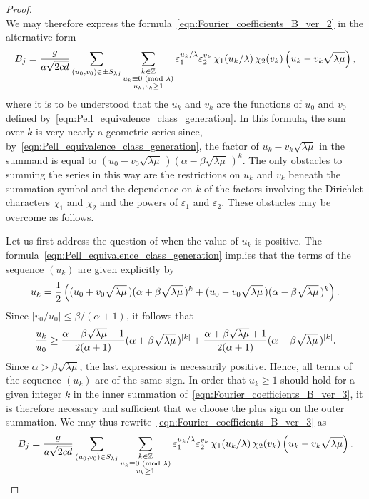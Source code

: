 \documentclass[11pt,reqno]{amsart}
\renewcommand{\=}{\;=\;}
\theoremstyle{myremark}
\begin{document}
\begin{proof}
\begin{equation}
\end{equation}
We may therefore express the formula~\eqref{eqn:Fourier_coefficients_B_ver_2} in the alternative form
\begin{equation} \label{eqn:Fourier_coefficients_B_ver_3}
B_j = {g \over a\sqrt{2cd}} \sum_{(u_0,v_0) \in \pm S_{\lambda j}} \sum_{\substack{k \in \mathbb{Z} \\ u_k \equiv 0 \text{ (mod $\lambda$)} \\ u_k, v_k \geq 1}} \varepsilon_1^{u_k/\lambda} \varepsilon_2^{v_k}\, \chi_1(u_k/\lambda)\, \chi_2(v_k) \left(u_k-v_k\sqrt{\lambda\mu} \right),
\end{equation}
where it is to be understood that the $u_k$ and $v_k$ are the functions of $u_0$ and $v_0$ defined by~\eqref{eqn:Pell_equivalence_class_generation}. 
In this formula, the sum over $k$ is very nearly a geometric series since, by~\eqref{eqn:Pell_equivalence_class_generation}, the factor of $u_k-v_k\sqrt{\lambda\mu}$ in the summand is equal to $(u_0 - v_0 \sqrt{\lambda\mu} \,) (\alpha - \beta \sqrt{\lambda\mu} \,)^k$. 
The only obstacles to summing the series in this way are the restrictions on $u_k$ and $v_k$ beneath the summation symbol and the dependence on $k$ of the factors involving the Dirichlet characters $\chi_1$ and $\chi_2$ and the powers of $\varepsilon_1$ and $\varepsilon_2$. 
These obstacles may be overcome as follows.

Let us first address the question of when the value of $u_k$ is positive. 
The formula~\eqref{eqn:Pell_equivalence_class_generation} implies that the terms of the sequence $(u_k)$ are given explicitly by
\[ u_k = {1 \over 2} \left( (u_0 + v_0 \sqrt{\lambda\mu} \,)(\alpha + \beta \sqrt{\lambda\mu} \,)^k + (u_0 - v_0 \sqrt{\lambda\mu} \,)(\alpha - \beta \sqrt{\lambda\mu} \,)^k \right). \]
Since $|v_0/u_0| \leq \beta/(\alpha+1)$, it follows that
\[ {u_k \over u_0} \geq {\alpha - \beta\sqrt{\lambda\mu} + 1 \over 2(\alpha+1)} (\alpha + \beta \sqrt{\lambda\mu} \,)^{|k|} + {\alpha + \beta\sqrt{\lambda\mu} + 1 \over 2(\alpha+1)} (\alpha - \beta \sqrt{\lambda\mu} \,)^{|k|}. \]
Since $\alpha > \beta\sqrt{\lambda\mu}$, the last expression is necessarily positive. Hence, all terms of the sequence $(u_k)$ are of the same sign. 
In order that $u_k \geq 1$ should hold for a given integer $k$ in the inner summation of~\eqref{eqn:Fourier_coefficients_B_ver_3}, it is therefore necessary and sufficient that we choose the plus sign on the outer summation. 
We may thus rewrite~\eqref{eqn:Fourier_coefficients_B_ver_3} as
\begin{equation} \label{eqn:Fourier_coefficients_B_ver_4}
B_j = {g \over a\sqrt{2cd}} \sum_{(u_0,v_0) \in S_{\lambda j}} \sum_{\substack{k \in \mathbb{Z} \\ u_k \equiv 0 \text{ (mod $\lambda$)} \\ v_k \geq 1}} \varepsilon_1^{u_k /\lambda} \varepsilon_2^{v_k}\, \chi_1(u_k/\lambda)\, \chi_2(v_k) \left(u_k-v_k\sqrt{\lambda\mu} \right).
\end{equation}


\end{proof}
\end{document}

